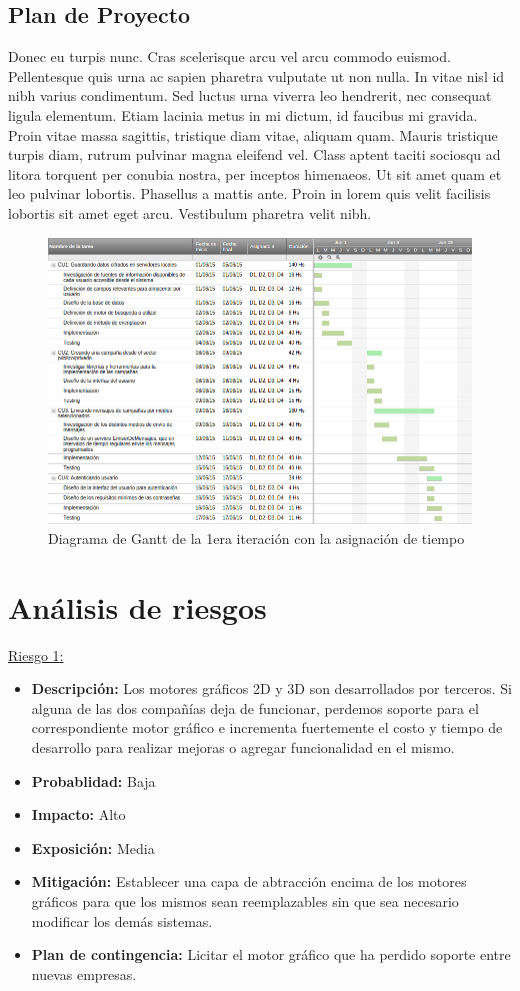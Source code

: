 \documentclass[a4paper, 10pt, twoside]{article}
\newcommand{\riesgo}[7]{
  \underline{Riesgo {#1}:}
  \begin{itemize}   
    \item \textbf{Descripción:} {#2}
    \item \textbf{Probablidad:} {#3}
    \item \textbf{Impacto:} {#4}
    \item \textbf{Exposición:} {#5}
    \item \textbf{Mitigación:} {#6}
    \item \textbf{Plan de contingencia:} {#7}
  \end{itemize}
}
\begin{document}
\subsection{Plan de Proyecto}
Donec eu turpis nunc. Cras scelerisque arcu vel arcu commodo euismod. Pellentesque quis urna ac sapien pharetra vulputate ut non nulla. In vitae nisl id nibh varius condimentum. Sed luctus urna viverra leo hendrerit, nec consequat ligula elementum. Etiam lacinia metus in mi dictum, id faucibus mi gravida. Proin vitae massa sagittis, tristique diam vitae, aliquam quam. Mauris tristique turpis diam, rutrum pulvinar magna eleifend vel. Class aptent taciti sociosqu ad litora torquent per conubia nostra, per inceptos himenaeos. Ut sit amet quam et leo pulvinar lobortis. Phasellus a mattis ante. Proin in lorem quis velit facilisis lobortis sit amet eget arcu. Vestibulum pharetra velit nibh.

\begin{landscape}
\begin{figure}[h!]
  \centering
  \includegraphics[width=20cm]{gantt.png}
  \caption{Diagrama de Gantt de la 1era iteración con la asignación de tiempo}
  \label{fig:gantt}
\end{figure}
\end{landscape}
\newpage


\section{Análisis de riesgos}
\label{riesgos:r1}
\riesgo{1}
    { Los motores gráficos 2D y 3D son desarrollados por terceros. Si alguna de las dos compañías deja de funcionar, perdemos soporte para el correspondiente motor gráfico e incrementa fuertemente el costo y tiempo de desarrollo para realizar mejoras o agregar funcionalidad en el mismo. }
    {Baja} %
    {Alto} %
    {Media} %
    {Establecer una capa de abtracción encima de los motores gráficos para que los mismos sean reemplazables sin que sea necesario modificar los demás sistemas.} %
    {Licitar el motor gráfico que ha perdido soporte entre nuevas empresas.} %
\end{document}
